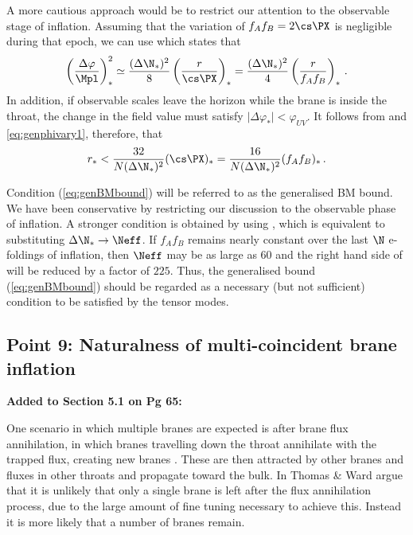 A more cautious approach would be to restrict our attention to 
the observable stage of inflation.
Assuming that the variation
of $f_Af_B = 2 \cs\PX$ is negligible during that epoch, we can use
 which states that 
% 
\begin{equation}
\label{eq:genphivary1-corr}
\left( \frac{\Delta \varphi}{\Mpl} \right)^2_{*} \simeq 
\frac{(\Delta \N_{*} )^2}{8} \left(\frac{r}{\cs\PX}\right)_*  
= \frac{(\Delta \N_{*} )^2}{4} \left(\frac{r}{f_A f_B}\right)_*  \,.
\end{equation}
% 
In addition, 
if observable scales leave the horizon 
while the brane is inside the throat, the change in the field value 
must satisfy $| \Delta \varphi_*|<\varphi_{UV}$. It follows from  and
\eqref{eq:genphivary1}, therefore, that 
% 
\begin{equation}
\label{eq:genBMbound-corr}
r_*< \frac{32}{N (\Delta \N_{*})^2} (\cs\PX)_* = \frac{16}{N (\Delta \N_{*})^2}
(f_Af_B)_* \,.
\end{equation}
% 

Condition 
(\ref{eq:genBMbound}) will be referred to as the 
generalised BM bound. 
We have been
conservative by restricting our discussion to the 
observable phase of inflation. A stronger condition is obtained by using
, which is equivalent to substituting $\Delta \N_* \rightarrow 
\Neff$. If 
$f_Af_B$ remains nearly constant over the last $\N$ 
e-foldings of inflation, 
then $\Neff$ may be as large as $60$ and the right hand side of  will be reduced
by a factor of $225$. 
Thus, the generalised bound 
(\ref{eq:genBMbound}) should be regarded as a necessary 
(but not sufficient) condition to be satisfied by the tensor modes.


\subsection{Point 9: Naturalness of multi-coincident brane inflation}
\textbf{Added to Section 5.1 on Pg 65:}

One scenario in which multiple branes are expected is after brane flux annihilation, in which
branes travelling down the throat annihilate with the trapped flux, creating new branes
\cite{thomasward, DeWolfe:2004qx, Kachru:2002gs}. These are then attracted by other branes and
fluxes in other throats and propagate toward the bulk.
In  Thomas \& Ward argue that it is unlikely that only a single brane is left
after the flux annihilation process, due to the large amount of fine tuning necessary to achieve
this. Instead it is more likely that a number of branes remain.


